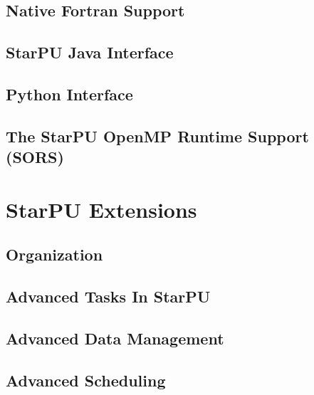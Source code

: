 \chapter{Native Fortran Support}
\label{NativeFortranSupport}
\hypertarget{NativeFortranSupport}{}


\chapter{StarPU Java Interface}
\label{StarPUJavaInterface}
\hypertarget{StarPUJavaInterface}{}


\chapter{Python Interface}
\label{PythonInterface}
\hypertarget{PythonInterface}{}


\chapter{The StarPU OpenMP Runtime Support (SORS)}
\label{OpenMPRuntimeSupport}
\hypertarget{OpenMPRuntimeSupport}{}


\part{StarPU Extensions}

\chapter{Organization}
\label{IntroExtensions}
\hypertarget{IntroExtensions}{}


\chapter{Advanced Tasks In StarPU}
\label{AdvancedTasksInStarPU}
\hypertarget{AdvancedTasksInStarPU}{}


\chapter{Advanced Data Management}
\label{AdvancedDataManagement}
\hypertarget{AdvancedDataManagement}{}


\chapter{Advanced Scheduling}
\label{AdvancedScheduling}
\hypertarget{AdvancedScheduling}{}


